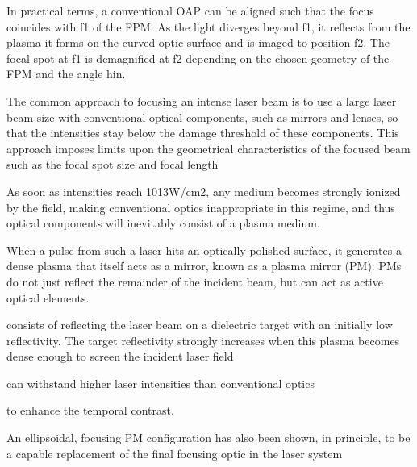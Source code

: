 
In practical terms, a conventional OAP can be aligned such that the focus coincides with f1 of the FPM. As the light diverges beyond f1, it reflects from the plasma it forms on the curved optic surface and is imaged to position f2. The focal spot at f1 is demagnified at f2 depending on the chosen geometry of the FPM and the angle hin.

The common approach to focusing an intense laser beam is to use a large laser beam size with conventional optical components, such as mirrors and lenses, so that the intensities stay below the damage threshold of these components. This approach imposes limits upon the geometrical characteristics of the focused beam such as the focal spot size and focal length

As soon as intensities reach 1013W/cm2, any medium becomes strongly ionized by the field, making conventional optics inappropriate in this regime, and thus optical components will inevitably consist of a plasma medium.

When a pulse from such a laser hits an optically polished surface, it generates a dense plasma that itself acts as a mirror, known as a plasma mirror (PM). PMs do not just reflect the remainder of the incident beam, but can act as active optical elements.

consists of reflecting the laser beam on a dielectric target with an initially low reflectivity. The target reflectivity strongly increases when this plasma becomes dense enough to screen the incident laser field

can withstand higher laser intensities than conventional optics

to enhance the temporal contrast.

An ellipsoidal, focusing PM configuration has also been shown, in principle, to be a capable replacement of the final focusing optic in the laser system

